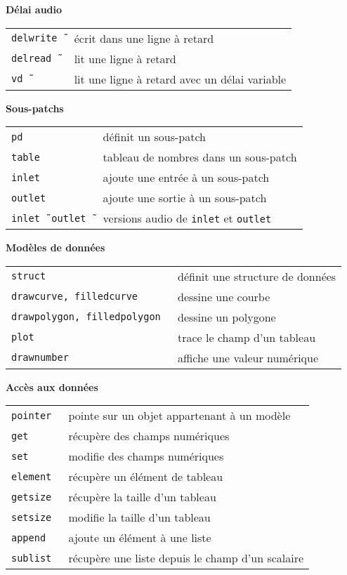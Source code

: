 \documentclass[a4paper, landscape, 10pt]{article}
\newcommand{\refcardtitle}[1]{
  \begin{center}
    \textbf{\small{#1}} %
  \end{center}
}
\begin{document}
\begin{multicols}{3}
  \refcardtitle{Délai audio}
  \begin{tabularx}{9cm}{>{\tt}l X}
    delwrite\~\ & écrit dans une ligne à retard \\
    delread\~\ & lit une ligne à retard \\
    vd\~\ & lit une ligne à retard avec un délai variable \\
  \end{tabularx}

  \refcardtitle{Sous-patchs}
  \begin{tabularx}{9cm}{>{\tt}l X}
    pd & définit un sous-patch \\
    table & tableau de nombres dans un sous-patch \\
    inlet & ajoute une entrée à un sous-patch \\
    outlet & ajoute une sortie à un sous-patch \\
    inlet\~\, outlet\~\ & versions audio de \texttt{inlet} et \texttt{outlet} \\
  \end{tabularx}

  \refcardtitle{Modèles de données}
  \begin{tabularx}{9cm}{>{\tt}l X}
    struct & définit une structure de données \\
    drawcurve, filledcurve & dessine une courbe \\
    drawpolygon, filledpolygon & dessine un polygone \\
    plot & trace le champ d'un tableau \\
    drawnumber & affiche une valeur numérique \\
  \end{tabularx}

  \refcardtitle{Accès aux données}
  \begin{tabularx}{9cm}{>{\tt}l X}
    pointer & pointe sur un objet appartenant à un modèle \\
    get & récupère des champs numériques \\
    set & modifie des champs numériques \\
    element & récupère un élément de tableau \\
    getsize & récupère la taille d'un tableau \\
    setsize & modifie la taille d'un tableau \\
    append & ajoute un élément à une liste \\
    sublist & récupère une liste depuis le champ d'un scalaire \\
  \end{tabularx}



\end{multicols}
\end{document}
